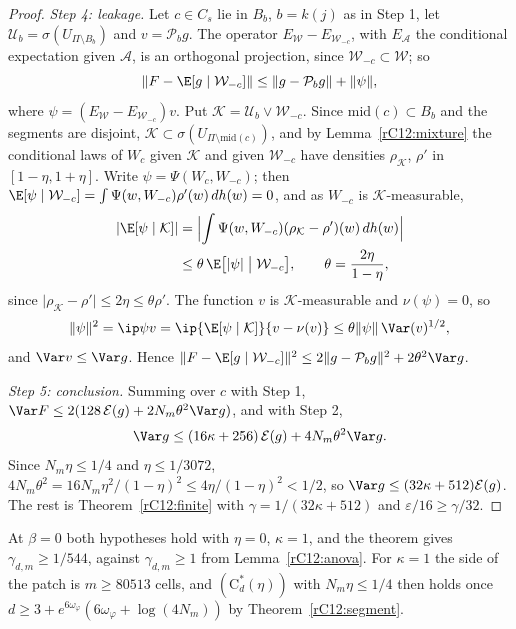\begin{proof}
\emph{Step 4: leakage.} Let $c\in C_s$ lie in $B_b$, $b=k(j)$ as in Step 1,
let $\mathcal U_b=\sigma(U_{\Pi\setminus B_b})$ and $v=\mathcal P_bg$. The
operator $E_{\mathcal W}-E_{\mathcal W_{-c}}$, with $E_{\mathcal A}$ the
conditional expectation given $\mathcal A$, is an orthogonal projection,
since $\mathcal W_{-c}\subset\mathcal W$; so
\[
\lVert F-\E[g\mid\mathcal W_{-c}]\rVert\le\lVert g-\mathcal P_bg\rVert+
\lVert\psi\rVert,
\]
where $\psi=(E_{\mathcal W}-E_{\mathcal W_{-c}})v$.
Put $\mathcal K=\mathcal U_b\vee\mathcal W_{-c}$. Since $\mathrm{mid}(c)
\subset B_b$ and the segments are disjoint, $\mathcal K\subset\sigma(U_{\Pi
\setminus\mathrm{mid}(c)})$, and by Lemma~\ref{rC12:mixture} the
conditional laws of $W_c$ given $\mathcal K$ and given $\mathcal W_{-c}$
have densities $\rho_{\mathcal K}$, $\rho'$ in $[1-\eta,1+\eta]$. Write
$\psi=\Psi(W_c,W_{-c})$; then $\E[\psi\mid\mathcal W_{-c}]=\int\Psi(w,
W_{-c})\rho'(w)\,dh(w)=0$, and as $W_{-c}$ is $\mathcal K$-measurable,
\[
\begin{split}
\lvert\E[\psi\mid\mathcal K]\rvert&=\Bigl\lvert\int\Psi(w,W_{-c})(\rho_{
\mathcal K}-\rho')(w)\,dh(w)\Bigr\rvert\\
&\le\theta\,\E\bigl[\lvert\psi\rvert
\bigm|\mathcal W_{-c}\bigr],\qquad\theta=\frac{2\eta}{1-\eta},
\end{split}
\]
since $\lvert\rho_{\mathcal K}-\rho'\rvert\le2\eta\le\theta\rho'$. The
function $v$ is $\mathcal K$-measurable and $\nu(\psi)=0$, so
\[
\lVert\psi\rVert^2=\ip\psi v=\ip{\E[\psi\mid\mathcal K]}{v-\nu(v)}\le\theta
\lVert\psi\rVert\,\Var(v)^{1/2},
\]
and $\Var v\le\Var g$. Hence $\lVert F-\E[g\mid\mathcal W_{-c}]\rVert^2\le2
\lVert g-\mathcal P_bg\rVert^2+2\theta^2\Var g$.

\emph{Step 5: conclusion.} Summing over $c$ with Step 1,
$\Var F\le2(128\,\mathcal E(g)+2N_m\theta^2\Var g)$, and with Step 2,
\[
\Var g\le(16\kappa+256)\,\mathcal E(g)+4N_m\theta^2\Var g .
\]
Since $N_m\eta\le1/4$ and $\eta\le1/3072$, $4N_m\theta^2=16N_m\eta^2/(1-
\eta)^2\le4\eta/(1-\eta)^2<1/2$, so $\Var g\le(32\kappa+512)\mathcal E(g)$.
The rest is Theorem~\ref{rC12:finite} with $\gamma=1/(32\kappa+512)$ and
$\varepsilon/16\ge\gamma/32$.
\end{proof}

At $\beta=0$ both hypotheses hold with $\eta=0$, $\kappa=1$, and the theorem
gives $\gamma_{d,m}\ge1/544$, against $\gamma_{d,m}\ge1$ from
Lemma~\ref{rC12:anova}. For $\kappa=1$ the side of the patch is $m\ge80513$
cells, and $(\mathrm C^*_d(\eta))$ with $N_m\eta\le1/4$ then holds once
$d\ge3+e^{6\omega_\varphi}(6\omega_\varphi+\log(4N_m))$ by
Theorem~\ref{rC12:segment}.

